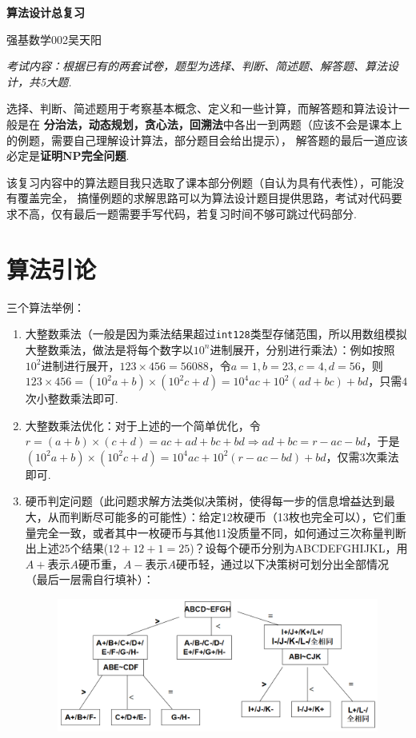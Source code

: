 \documentclass[12pt, a4paper, oneside]{ctexart}
\numberwithin{equation}{section}  %
\theoremstyle{definition}
\newenvironment{myTitle}[1]{
    \begin{center}
    {\zihao{-2}\bf #1\\}
    \zihao{-4}\it
}{\end{center}}  %
\begin{document}
\clearpage
\begin{myTitle}{算法设计总复习}
    强基数学002\quad 吴天阳
\end{myTitle}
{\it 考试内容：根据已有的两套试卷，题型为选择、判断、简述题、解答题、算法设计，共5大题.

选择、判断、简述题用于考察基本概念、定义和一些计算，而解答题和算法设计一般是在
\textbf{分治法，动态规划，贪心法，回溯法}中各出一到两题（应该不会是课本上的例题，需要自己理解设计算法，部分题目会给出提示），
解答题的最后一道应该必定是\textbf{证明NP完全问题}.

该复习内容中的算法题目我只选取了课本部分例题（自认为具有代表性），可能没有覆盖完全，
搞懂例题的求解思路可以为算法设计题目提供思路，考试对代码要求不高，仅有最后一题需要手写代码，若复习时间不够可跳过代码部分. }
\section{算法引论}
三个算法举例：
\begin{enumerate}
    \item 大整数乘法（一般是因为乘法结果超过\texttt{int128}类型存储范围，所以用数组模拟大整数乘法，做法是将每个数字以$10^n$进制展开，分别进行乘法）：例如按照$10^2$进制进行展开，$123\times 456=56088$，令$a=1,b=23,c=4,d=56$，则$123\times 456 = (10^2a+b)\times(10^2c+d) = 10^4ac+10^2(ad+bc)+bd$，只需$4$次小整数乘法即可.
    \item 大整数乘法优化：对于上述的一个简单优化，令$r = (a+b)\times(c+d) = ac+ad+bc+bd\Rightarrow ad+bc = r-ac-bd$，于是$(10^2a+b)\times(10^2c+d) = 10^4ac+10^2(r-ac-bd)+bd$，仅需$3$次乘法即可.
    \item 硬币判定问题（此问题求解方法类似决策树，使得每一步的信息增益达到最大，从而判断尽可能多的可能性）：给定12枚硬币（13枚也完全可以），它们重量完全一致，或者其中一枚硬币与其他11没质量不同，如何通过三次称量判断出上述25个结果($12+12+1=25$)？设每个硬币分别为ABCDEFGHIJKL，用$A+$表示$A$硬币重，$A-$表示$A$硬币轻，通过以下决策树可划分出全部情况（最后一层需自行填补）：
    \begin{figure}[htbp]
        \centering
        \includegraphics[scale=0.4]{判定硬币质量（决策树）.png}
    \end{figure}
\end{enumerate}
\end{document}
